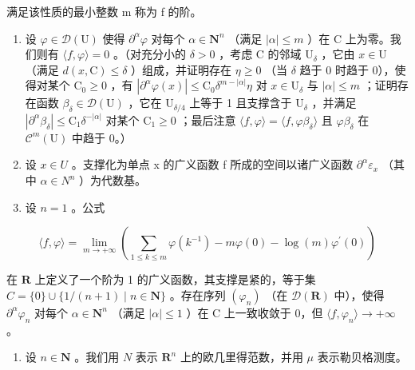 满足该性质的最小整数 m 称为 f 的阶。

\begin{enumerate}
\def\labelenumi{\alph{enumi})}
\setcounter{enumi}{1}
\item
  设 \(\varphi \in \mathcal{D}(\mathrm{U})\) 使得 \(\partial^{\alpha}\varphi\) 对每个 \(\alpha \in \mathbf{N}^{n}\) （满足 \(|\alpha| \leqslant m\) ）在 C 上为零。我们则有 \(\langle f, \varphi \rangle = 0\) 。（对充分小的 \(\delta > 0\) ，考虑 C 的邻域 \(\mathrm{U}_{\delta}\) ，它由 \(x \in \mathrm{U}\) （满足 \(d(x, \mathrm{C}) \leqslant \delta\) ）组成，并证明存在 \(\eta \geqslant 0\) （当 \(\delta\) 趋于 0 时趋于 0），使得对某个 \(\mathrm{C}_{0} \geqslant 0\) ，有 \(|\partial^{\alpha}\varphi(x)| \leqslant \mathrm{C}_{0}\delta^{m-|\alpha|}\eta\) 对 \(x \in \mathrm{U}_{\delta}\) 与 \(|\alpha| \leqslant m\) ；证明存在函数 \(\beta_{\delta} \in \mathcal{D}(\mathrm{U})\) ，它在 \(\mathrm{U}_{\delta/4}\) 上等于 1 且支撑含于 \(\mathrm{U}_{\delta}\) ，并满足 \(|\partial^{\alpha}\beta_{\delta}| \leqslant \mathrm{C}_{1}\delta^{-|\alpha|}\) 对某个 \(\mathrm{C}_{1} \geqslant 0\) ；最后注意 \(\langle f, \varphi \rangle = \langle f, \varphi\beta_{\delta} \rangle\) 且 \(\varphi\beta_{\delta}\) 在 \(\mathcal{C}^{m}(\mathrm{U})\) 中趋于 0。）
\item
  设 \(x \in U\) 。支撑化为单点 x 的广义函数 f 所成的空间以诸广义函数 \(\partial^{\alpha}\varepsilon_{x}\) （其中 \(\alpha \in N^{n}\) ）为代数基。
\item
  设 \(n = 1\) 。公式
\end{enumerate}

\[
\langle f, \varphi \rangle = \lim _ {m \rightarrow + \infty} \left(\sum_ {1 \leqslant k \leqslant m} \varphi (k ^ {- 1}) - m \varphi (0) - \log (m) \varphi^ {\prime} (0)\right)
\]

在 \(\mathbf{R}\) 上定义了一个阶为 1 的广义函数，其支撑是紧的，等于集 \(C = \{0\} \cup \{1/(n+1) \mid n \in \mathbf{N}\}\) 。存在序列 \((\varphi_n)\) （在 \(\mathcal{D}(\mathbf{R})\) 中），使得 \(\partial^{\alpha}\varphi_{n}\) 对每个 \(\alpha\in\mathbf{N}^{n}\) （满足 \(|\alpha|\leqslant1\) ）在 C 上一致收敛于 0，但 \(\langle f,\varphi_{n}\rangle\to+\infty\) 。

\begin{enumerate}
\def\labelenumi{\arabic{enumi})}
\setcounter{enumi}{24}
\tightlist
\item
  设 \(n \in \mathbf{N}\) 。我们用 \(N\) 表示 \(\mathbf{R}^n\) 上的欧几里得范数，并用 \(\mu\) 表示勒贝格测度。
\end{enumerate}

